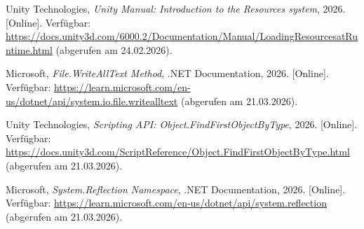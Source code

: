 \documentclass[12pt,a4paper]{article}
\begin{document}
\begin{description}[leftmargin=2em]
    \item[{[14]}] Unity Technologies, \textit{Unity Manual: Introduction to the Resources system}, 2026. [Online]. Verfügbar: \url{https://docs.unity3d.com/6000.2/Documentation/Manual/LoadingResourcesatRuntime.html} (abgerufen am 24.02.2026).

    \item[{[15]}] Microsoft, \textit{File.WriteAllText Method}, .NET Documentation, 2026. [Online]. Verfügbar: \url{https://learn.microsoft.com/en-us/dotnet/api/system.io.file.writealltext} (abgerufen am 21.03.2026).

    \item[{[16]}] Unity Technologies, \textit{Scripting API: Object.FindFirstObjectByType}, 2026. [Online]. Verfügbar: \url{https://docs.unity3d.com/ScriptReference/Object.FindFirstObjectByType.html} (abgerufen am 21.03.2026).

    \item[{[17]}] Microsoft, \textit{System.Reflection Namespace}, .NET Documentation, 2026. [Online]. Verfügbar: \url{https://learn.microsoft.com/en-us/dotnet/api/system.reflection} (abgerufen am 21.03.2026).
\end{description}

\listoffigures
\listoftables
\end{document}
